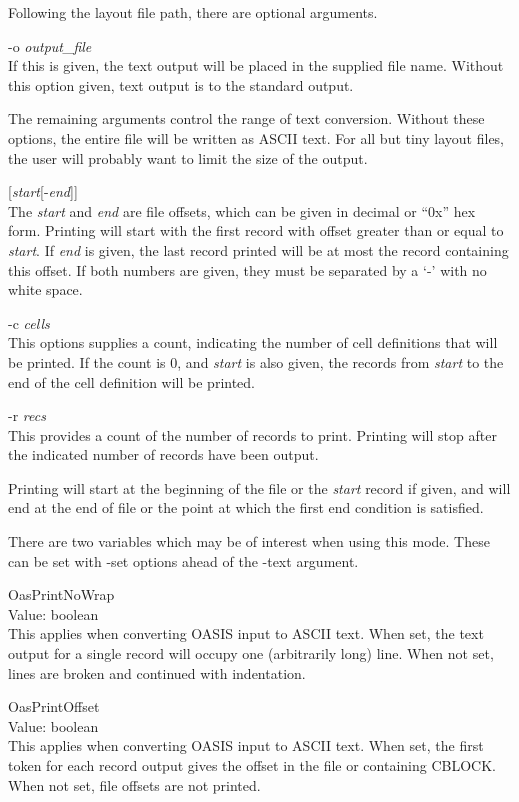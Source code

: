 Following the layout file path, there are optional arguments.

\begin{description}
\item{\vt -o} {\it output\_file}\\
If this is given, the text output will be placed in the supplied file
name.  Without this option given, text output is to the standard
output.

The remaining arguments control the range of text conversion. 
Without these options, the entire file will be written as ASCII text. 
For all but tiny layout files, the user will probably want to limit
the size of the output.

\item{[{\it start\/}[-{\it end\/}]]}\\
The {\it start} and {\it end} are file offsets, which can be given in
decimal or ``0x'' hex form.  Printing will start with the first
record with offset greater than or equal to {\it start\/}.  If {\it
end} is given, the last record printed will be at most the record
containing this offset.  If both numbers are given, they must be
separated by a `{\vt -}' with no white space.

\item{\vt -c} {\it cells}\\
This options supplies a count, indicating the number of cell
definitions that will be printed.  If the count is 0, and {\it start}
is also given, the records from {\it start} to the end of the cell
definition will be printed.

\item{\vt -r} {\it recs}\\
This provides a count of the number of records to print.  Printing
will stop after the indicated number of records have been output.
\end{description}

Printing will start at the beginning of the file or the {\it start}
record if given, and will end at the end of file or the point at
which the first end condition is satisfied.

There are two variables which may be of interest when using this
mode.  These can be set with {\vt -set} options ahead of the
{\vt -text} argument.

\begin{description}
\item{\et OasPrintNoWrap}\\
Value: boolean\\
This applies when converting OASIS input to ASCII text.  When set,
the text output for a single record will occupy one (arbitrarily
long) line.  When not set, lines are broken and continued with
indentation.

\item{\et OasPrintOffset}\\
Value: boolean\\
This applies when converting OASIS input to ASCII text.  When set,
the first token for each record output gives the offset in the file
or containing CBLOCK.  When not set, file offsets are not printed.
\end{description}


